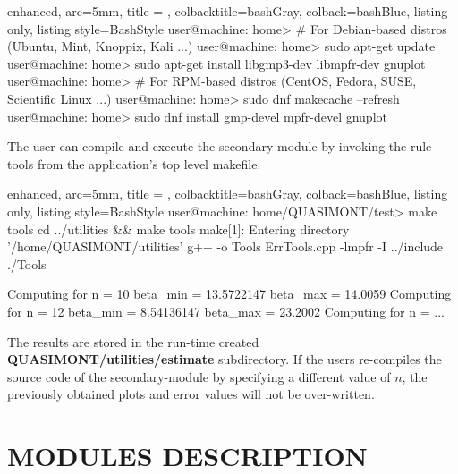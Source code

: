 \documentclass[a4paper, twosided]{book}
\begin{document}
\vspace{0.5cm}
\begin{tcblisting}{enhanced,
                   arc=5mm,
                   title = \color{black}{\large \ttfamily Installation of third-party libraries for the secondary module},
                   colbacktitle=bashGray,
                   colback=bashBlue,
                   listing only,
                   listing style=BashStyle}
user@machine: home> # For Debian-based distros (Ubuntu, Mint, Knoppix, Kali ...)
user@machine: home> sudo apt-get update
user@machine: home> sudo apt-get install libgmp3-dev libmpfr-dev gnuplot
user@machine: home> # For RPM-based distros (CentOS, Fedora, SUSE, Scientific Linux ...)
user@machine: home> sudo dnf makecache --refresh
user@machine: home> sudo dnf install gmp-devel mpfr-devel gnuplot
\end{tcblisting}
\vspace{0.5cm}

\noindent
The user can compile and execute the secondary module by invoking the rule \colorbox{poliGrayBlue}{tools} from the application's top level \colorbox{poliGrayBlue}{makefile}.

\vspace{0.25cm}
\begin{tcblisting}{enhanced,
                   arc=5mm,
                   title = \color{black}{\large \ttfamily Compilation and execution of QUASIMONT's secondary module},
                   colbacktitle=bashGray,
                   colback=bashBlue,
                   listing only,
                   listing style=BashStyle}
user@machine: home/QUASIMONT/test> make tools
cd ../utilities && make tools
make[1]: Entering directory '/home/QUASIMONT/utilities'
g++ -o Tools ErrTools.cpp -lmpfr -I ../include
./Tools

Computing for n = 10
    beta_min = 13.5722147
    beta_max = 14.0059
Computing for n = 12
    beta_min = 8.54136147
    beta_max = 23.2002
Computing for n = ...
\end{tcblisting}

\noindent
The results are stored in the run-time created \colorbox{poliGrayBlue}{\textbf{QUASIMONT/utilities/estimate}} subdirectory. If the users re-compiles the source code of the secondary-module by specifying a different value of $n$, the previously obtained plots and error values will not be over-written.


\chapter[Modules description]{\Huge \ttfamily MODULES DESCRIPTION}\label{Chap4}
\end{document}
